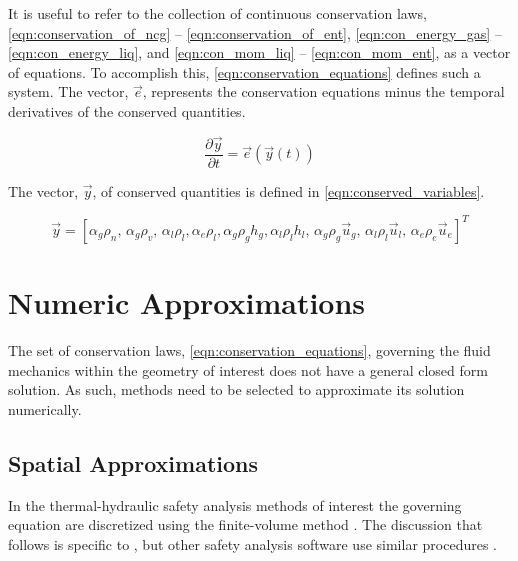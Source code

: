 It is useful to refer to the collection of continuous conservation laws, \eqref{eqn:conservation_of_ncg} -- \eqref{eqn:conservation_of_ent}, \eqref{eqn:con_energy_gas} -- \eqref{eqn:con_energy_liq}, and \eqref{eqn:con_mom_liq} -- \eqref{eqn:con_mom_ent}, as a vector of equations.
To accomplish this, \eqref{eqn:conservation_equations} defines such a system.
The vector, $\vec{e}$, represents the conservation equations minus the temporal derivatives of the conserved quantities.

\begin{equation}
\label{eqn:conservation_equations}
\frac{\partial \vec{y} }{\partial t} = \vec{e}(\vec{y}(t))
\end{equation}

The vector, $\vec{y}$, of conserved quantities is defined in \eqref{eqn:conserved_variables}.

\begin{equation}
\label{eqn:conserved_variables}
\vec{y} = [\alpha_g \rho_n,\, \alpha_g \rho_v,\, \alpha_l \rho_l, \alpha_e \rho_l, \alpha_g \rho_g h_g, \alpha_l \rho_l h_l,\, \alpha_g \rho_g \vec{u}_g,\, \alpha_l \rho_l \vec{u}_l,\, \alpha_e \rho_e \vec{u}_e]^{T}
\end{equation}

\section{Numeric Approximations}
\label{sect:numeric_approximation}
The set of conservation laws, \eqref{eqn:conservation_equations}, governing the fluid mechanics within the geometry of interest does not have a general closed form solution.
As such, methods need to be selected to approximate its solution numerically.

\subsection{Spatial Approximations}
\label{subsect:spatial_approx}
In the thermal-hydraulic safety analysis methods of interest the governing equation are discretized using the finite-volume method \cite{LeVeque2002}.
The discussion that follows is specific to \cobra{}, but other safety analysis software use similar procedures \cite{RELAP,TRACE}.

